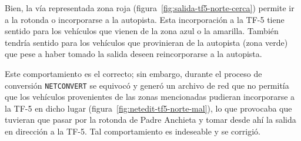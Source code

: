 Bien, la vía representada zona roja (figura~\ref{fig:salida-tf5-norte-cerca}) permite ir a la rotonda o incorporarse a la autopista. Esta incorporación a la TF-5 tiene sentido para los vehículos que vienen de la zona azul o la amarilla. También tendría sentido para los vehículos que provinieran de la autopista (zona verde) que pese a haber tomado la salida deseen reincorporarse a la autopista.

Este comportamiento es el correcto; sin embargo, durante el proceso de conversión \texttt{NETCONVERT} se equivocó y generó un archivo de red que no permitía que los vehículos provenientes de las zonas mencionadas pudieran incorporarse a la TF-5 en dicho lugar (figura~\ref{fig:netedit-tf5-norte-mal}), lo que provocaba que tuvieran que pasar por la rotonda de Padre Anchieta y tomar desde ahí la salida en dirección a la TF-5. Tal comportamiento es indeseable y se corrigió.

